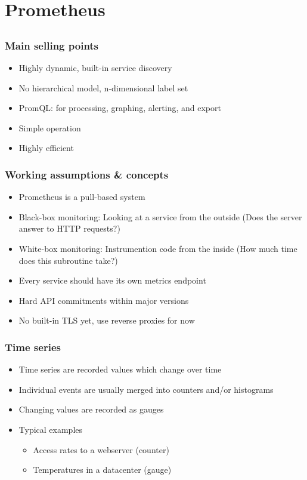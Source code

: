 \documentclass[aspectratio=169]{beamer}
\begin{document}
\section{Prometheus}


\subsection{}

\begin{frame}
	\frametitle{Main selling points}
	\begin{itemize}
		\item Highly dynamic, built-in service discovery
		\item No hierarchical model, n-dimensional label set
		\item PromQL: for processing, graphing, alerting, and export
		\item Simple operation
		\item Highly efficient
	\end{itemize}
\end{frame}

\begin{frame}
	\frametitle{Working assumptions \& concepts}
	\begin{itemize}
		\item Prometheus is a pull-based system
		\item Black-box monitoring: Looking at a service from the outside (Does the server answer to HTTP requests?)
		\item White-box monitoring: Instrumention code from the inside (How much time does this subroutine take?)
		\item Every service should have its own metrics endpoint
		\item Hard API commitments within major versions
		\item No built-in TLS yet, use reverse proxies for now
	\end{itemize}
\end{frame}

\begin{frame}
	\frametitle{Time series}
	\begin{itemize}
		\item Time series are recorded values which change over time
		\item Individual events are usually merged into counters and/or histograms
		\item Changing values are recorded as gauges
		\item Typical examples
		\begin{itemize}
			\item Access rates to a webserver (counter)
			\item Temperatures in a datacenter (gauge)
		\end{itemize}
	\end{itemize}
\end{frame}
\end{document}
